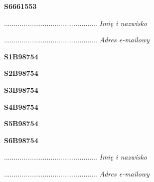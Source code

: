 \begin{turn}{90}\huge \textbf{S6661553}\end{turn}

\begin{turn}{90}\begin{minipage}{\linewidth} \vspace{20mm} ................................................  \textit{Imię i nazwisko}\end{minipage}\end{turn}

\begin{turn}{90}\begin{minipage}{\linewidth} \vspace{20mm} ................................................  \textit{Adres e-mailowy}\end{minipage}\end{turn}

\begin{turn}{90}\huge \textbf{S1B98754}\end{turn}

\begin{turn}{90}\huge \textbf{S2B98754}\end{turn}

\begin{turn}{90}\huge \textbf{S3B98754}\end{turn}

\begin{turn}{90}\huge \textbf{S4B98754}\end{turn}

\begin{turn}{90}\huge \textbf{S5B98754}\end{turn}

\begin{turn}{90}\huge \textbf{S6B98754}\end{turn}

\begin{turn}{90}\begin{minipage}{\linewidth} \vspace{20mm} ................................................  \textit{Imię i nazwisko}\end{minipage}\end{turn}

\begin{turn}{90}\begin{minipage}{\linewidth} \vspace{20mm} ................................................  \textit{Adres e-mailowy}\end{minipage}\end{turn}

